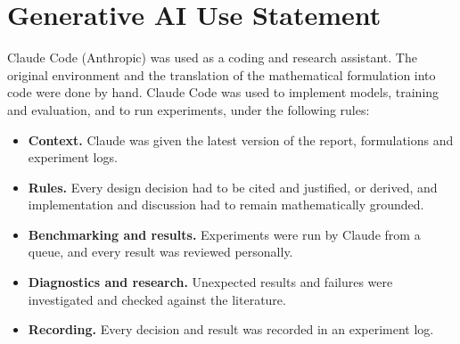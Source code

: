 \documentclass[12pt]{article}
\providecommand{\DIFaddtex}[1]{{\color{red}#1}} %
\providecommand{\DIFdeltex}[1]{} %
\providecommand{\DIFaddbegin}{} %
\providecommand{\DIFaddend}{} %
\providecommand{\DIFdelbegin}{} %
\providecommand{\DIFdelend}{} %
\providecommand{\DIFadd}[1]{\texorpdfstring{\DIFaddtex{#1}}{#1}} %
\providecommand{\DIFdel}[1]{\texorpdfstring{\DIFdeltex{#1}}{}} %
\providecommand{\DIFscaledelfig}{0.5}
\newlength{\DIFdelgraphicswidth} %
\newlength{\DIFdelgraphicsheight} %
\providecommand{\DIFaddincludegraphics}[2][]{{\color{blue}\fbox{\DIFOincludegraphics[#1]{#2}}}} %
\providecommand{\DIFdelincludegraphics}[2][]{%
\sbox{\DIFdelgraphicsbox}{\DIFOincludegraphics[#1]{#2}}%
\settoboxwidth{\DIFdelgraphicswidth}{\DIFdelgraphicsbox} %
\settoboxtotalheight{\DIFdelgraphicsheight}{\DIFdelgraphicsbox} %
\scalebox{\DIFscaledelfig}{%
\parbox[b]{\DIFdelgraphicswidth}{\usebox{\DIFdelgraphicsbox}\\[-\baselineskip] \rule{\DIFdelgraphicswidth}{0em}}\llap{\resizebox{\DIFdelgraphicswidth}{\DIFdelgraphicsheight}{%
\setlength{\unitlength}{\DIFdelgraphicswidth}%
\begin{picture}(1,1)%
\thicklines\linethickness{2pt} %
{\color[rgb]{1,0,0}\put(0,0){\framebox(1,1){}}}%
{\color[rgb]{1,0,0}\put(0,0){\line( 1,1){1}}}%
{\color[rgb]{1,0,0}\put(0,1){\line(1,-1){1}}}%
\end{picture}%
}\hspace*{3pt}}} %
} %
\DeclareRobustCommand{\DIFaddbegin}{\DIFOaddbegin \let\includegraphics\DIFaddincludegraphics} %
\DeclareRobustCommand{\DIFaddend}{\DIFOaddend \let\includegraphics\DIFOincludegraphics} %
\DeclareRobustCommand{\DIFdelbegin}{\DIFOdelbegin \let\includegraphics\DIFdelincludegraphics} %
\DeclareRobustCommand{\DIFdelend}{\DIFOaddend \let\includegraphics\DIFOincludegraphics} %
\begin{document}
\DIFaddbegin \section*{\DIFadd{Generative AI Use Statement}}
\DIFadd{Claude Code (Anthropic) was used as a coding and research assistant. The original environment and the translation of the mathematical formulation into code were done by hand. Claude Code was used to implement models, training and evaluation, and to run experiments, under the following rules:
}\DIFaddend \begin{itemize}
    \DIFdelbegin %

\DIFdel{A succinct title that reects the focus of the project
    }\DIFdelend \item \DIFdelbegin \DIFdel{Your name, your supervisor’s name(s)}\DIFdelend \DIFaddbegin \textbf{\DIFadd{Context.}} \DIFadd{Claude was given the latest version of the report, formulations and experiment logs.
    }\DIFaddend \item \DIFdelbegin \DIFdel{Concise introduction to your project which orientates the reader (Abstract)}\DIFdelend \DIFaddbegin \textbf{\DIFadd{Rules.}} \DIFadd{Every design decision had to be cited and justified, or derived, and implementation and discussion had to remain mathematically grounded.
    }\DIFaddend \item \DIFdelbegin \DIFdel{Project aims/goals/objectives
    }\DIFdelend \DIFaddbegin \textbf{\DIFadd{Benchmarking and results.}} \DIFadd{Experiments were run by Claude from a queue, and every result was reviewed personally.
    }\DIFaddend \item \DIFdelbegin \DIFdel{Specific project outputs/deliverables
    }\DIFdelend \DIFaddbegin \textbf{\DIFadd{Diagnostics and research.}} \DIFadd{Unexpected results and failures were investigated and checked against the literature.
    }\DIFaddend \item \DIFdelbegin \DIFdel{Background : reference to literature justifying the value and importance of the project
    }%

\DIFdel{Methodology
    }%

\DIFdel{Results: Present results in a format relevant to your discipline. Use graphical and tabular format where appropriate.
    }%

\DIFdel{Discussion – what you achieved/discovered, the relevance of what you achieved
    }%

\DIFdel{Conclusion
    }%

\DIFdel{Future projects that may build on this project or new ideas for future projects emerging from your work this year
}\DIFdelend \DIFaddbegin \textbf{\DIFadd{Recording.}} \DIFadd{Every decision and result was recorded in an experiment log.
}\DIFaddend \end{itemize}
\end{document}
